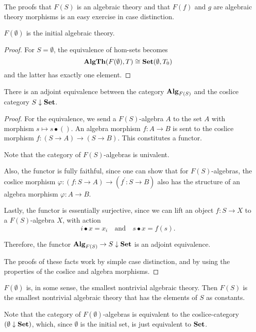The proofs that $ F(S) $ is an algebraic theory and that $ F(f) $ and $ g $ are algebraic theory morphisms is an easy exercise in case distinction.

\begin{corollary}
  $ F(\emptyset) $ is the initial algebraic theory.
\end{corollary}
\begin{proof}
  For $ S = \emptyset $, the equivalence of hom-sets becomes
  \[ \mathbf{AlgTh}(F(\emptyset), T) \cong \mathbf{Set}(\emptyset, T_0) \]
  and the latter has exactly one element.
\end{proof}

\begin{lemma}
  There is an adjoint equivalence between the category $ \mathbf{Alg}_{F(S)} $ and the coslice category $ S \downarrow \mathbf{Set} $.
\end{lemma}
\begin{proof}
  For the equivalence, we send a $ F(S) $-algebra $ A $ to the set $ A $ with morphism $ s \mapsto s \bullet () $. An algebra morphism $ f: A \to B $ is sent to the coslice morphism $ f: (S \to A) \to (S \to B) $. This constitutes a functor.

  Note that the category of $ F(S) $-algebras is univalent.

  Also, the functor is fully faithful, since one can show that for $ F(S) $-algebras, the coslice morphism $ \varphi: (f: S \to A) \to (f^\prime: S \to B) $ also has the structure of an algebra morphism $ \varphi: A \to B $.

  Lastly, the functor is essentially surjective, since we can lift an object $ f: S \to X $ to a $ F(S) $-algebra $ X $, with action
  \[ i \bullet x = x_i \quad \text{and} \quad s \bullet x = f(s). \]

  Therefore, the functor $ \mathbf{Alg}_{F(S)} \to S \downarrow \mathbf{Set} $ is an adjoint equivalence.

  The proofs of these facts work by simple case distinction, and by using the properties of the coslice and algebra morphisms.
\end{proof}

\begin{remark}
  $ F(\emptyset) $ is, in some sense, the smallest nontrivial algebraic theory. Then $ F(S) $ is the smallest nontrivial algebraic theory that has the elements of $ S $ as constants.
\end{remark}

\begin{remark}\label{rem:free-theory-algebra-set}
  Note that the category of $ F(\emptyset) $-algebras is equivalent to the coslice-category $ (\emptyset \downarrow \mathbf{Set}) $, which, since $ \emptyset $ is the initial set, is just equivalent to $ \mathbf{Set} $.
\end{remark}

